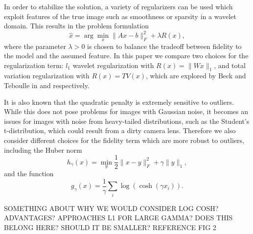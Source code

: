 \documentclass[10pt,a4paper]{article}
\begin{document}
	In order to stabilize the solution, a variety of regularizers can be used which exploit features of the true image such as smoothness or sparsity in a wavelet domain. This results in the problem formulation
	\begin{equation}
	\hat{x} = \arg\min_{x} \| Ax - b \|_F^2 + \lambda R(x),
	\end{equation}
	where the parameter $\lambda > 0$ is chosen to balance the tradeoff between fidelity to the model and the assumed feature. In this paper we compare two choices for the regularization term: $l_1$ wavelet regularization with $R(x) = \| Wx \|_1$, and total variation regularization with $R(x) = TV(x)$, which are explored by Beck and Teboulle in \cite{TV} and \cite{FISTA} respectively.
	
	It is also known that the quadratic penalty is extremely sensitive to outliers. While this does not pose problems for images with Gaussian noise, it becomes an issues for images with noise from heavy-tailed distributions, such as the Student's t-distribution, which could result from a dirty camera lens. Therefore we also consider different choices for the fidelity term which are more robust to outliers, including the Huber norm
	\begin{equation} \label{huber}
	h_{\gamma}(x) = \min_y \frac{1}{2} \| x - y \|_F^2 + \gamma \| y \|_1,
	\end{equation}
	and the function
	\begin{equation} \label{log_cosh}
	g_{\gamma}(x) = \frac{1}{\gamma} \sum_i \log\left(\cosh\left(\gamma x_i\right)\right).
	\end{equation}
	
	\newpage
	SOMETHING ABOUT WHY WE WOULD CONSIDER LOG COSH? ADVANTAGES? APPROACHES L1 FOR LARGE GAMMA? DOES THIS BELONG HERE? SHOULD IT BE SMALLER? REFERENCE FIG 2 \\
	
\end{document}
